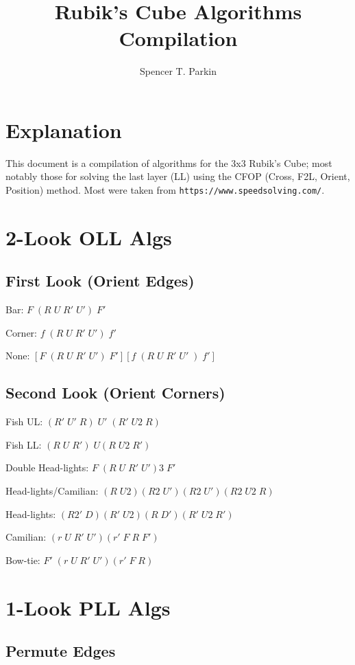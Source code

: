 \documentclass[12pt]{article}
\title{Rubik's Cube Algorithms Compilation}
\author{Spencer T. Parkin}
\begin{document}
\maketitle

\section*{Explanation}

This document is a compilation of algorithms for the 3x3 Rubik's Cube; most notably those
for solving the last layer (LL) using the CFOP (Cross, F2L, Orient, Position) method.
Most were taken from \texttt{https://www.speedsolving.com/}.

\section*{2-Look OLL Algs}

\subsection*{First Look (Orient Edges)}

Bar: $F\;(R\;U\;R'\;U')\;F'$

\noindent
Corner: $f\;(R\;U\;R'\;U')\;f'$

\noindent
None: $[F\;(R\;U\;R'\;U')\;F'][f\;(R\;U\;R'\;U'\;)\;f']$

\subsection*{Second Look (Orient Corners)}

Fish UL: $(R'\;U'\;R)\;U'\;(R'\;U2\;R)$

\noindent
Fish LL: $(R\;U\;R')\;U(R\;U2\;R')$

\noindent
Double Head-lights: $F\;(R\;U\;R'\;U')3\;F'$

\noindent
Head-lights/Camilian: $(R\;U2)(R2\;U')(R2\;U')(R2\;U2\;R)$

\noindent
Head-lights: $(R2'\;D)(R'\;U2)(R\;D')(R'\;U2\;R')$

\noindent
Camilian: $(r\;U\;R'\;U')(r'\;F\;R\;F')$

\noindent
Bow-tie: $F'\;(r\;U\;R'\;U')(r'\;F\;R)$

\section*{1-Look PLL Algs}

\subsection*{Permute Edges}
\end{document}
